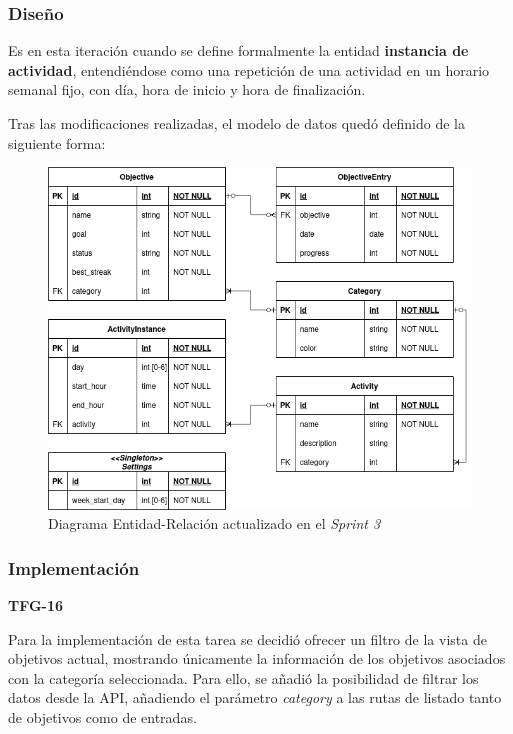\documentclass[10pt, a4paper]{aqademic}
\begin{document}
\subsubsection{Diseño}

Es en esta iteración cuando se define formalmente la entidad \textbf{instancia de actividad}, entendiéndose como una repetición de una actividad en un horario semanal fijo, con día, hora de inicio y hora de finalización.

Tras las modificaciones realizadas, el modelo de datos quedó definido de la siguiente forma:

\begin{figure}[h!]
	\centering
	\includegraphics[scale=0.6]{img/sprint3-modelo-datos.png}
	\caption{Diagrama Entidad-Relación actualizado en el \textit{Sprint 3}}
\end{figure}


\subsubsection{Implementación}

\textbf{TFG-16}

Para la implementación de esta tarea se decidió ofrecer un filtro de la vista de objetivos actual, mostrando únicamente la información de los objetivos asociados con la categoría seleccionada. Para ello, se añadió la posibilidad de filtrar los datos desde la API, añadiendo el parámetro \textit{category} a las rutas de listado tanto de objetivos como de entradas.
\end{document}
